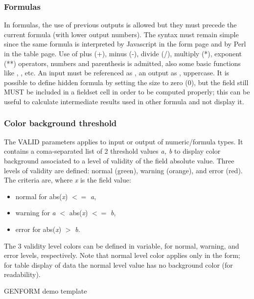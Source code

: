 \subsubsection{Formulas}

In formulas, the use of previous outputs is allowed but they must precede the current formula (with lower output numbers). The syntax must remain simple since the same formula is interpreted by Javascript in the form page and by Perl in the table page. Use of plus (+), minus (-), divide (/), multiply (*), exponent (**) operators, numbers and parenthesis is admitted, also some basic functions like , , etc. An input must be referenced as , an output as , uppercase. It is possible to define hidden formula by setting the size to zero (0), but the field still MUST be included in a fieldset cell in order to be computed properly; this can be useful to calculate intermediate results used in other formula and not display it.
 
\subsubsection{Color background threshold}

The VALID parameters applies to input or output of numeric/formula types. It contains a coma-separated list of 2 threshold values {\it a, b} to display color background associated to a level of validity of the field absolute value. Three levels of validity are defined: normal (green), warning (orange), and error (red). The criteria are, where {\it x} is the field value:
\begin{itemize}
	\item normal for abs({\it x}) $<=$ {\it a},
	\item warning for {\it a} $<$ abs({\it x}) $<=$ {\it b},
	\item error for abs({\it x}) $>$ {\it b}.
\end{itemize}

The 3 validity level colors can be defined in  variable, for normal, warning, and error levels, respectively. Note that normal level color applies only in the form; for table display of data the normal level value has no background color (for readability).




\begin{table}[htp]
\caption{GENFORM demo template}
\label{genform_template}

\end{table}



